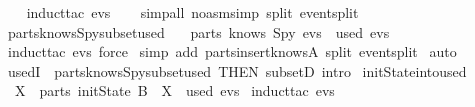 \begin{isabellebody}
  \isadelimproof
  \isanewline
  \ \ %
  \endisadelimproof
  \isatagproof
  \isamarkupfalse%
  \ {\isacharparenleft}induct{\isacharunderscore}tac\ {\isachardoublequoteopen}evs{\isachardoublequoteclose}{\isacharparenright}\isanewline
  \ \ \isamarkupfalse%
  \ {\isacharparenleft}simp{\isacharunderscore}all\ {\isacharparenleft}no{\isacharunderscore}asm{\isacharunderscore}simp{\isacharparenright}\ split{\isacharcolon}\ event{\isachardot}split{\isacharparenright}\isanewline
  \isamarkupfalse%
  \endisatagproof
  {\isafoldproof}%
  \isadelimproof
  \isanewline
  \endisadelimproof
  \isanewline
  \isanewline
  \isanewline
  \isamarkupfalse%
  \ parts{\isacharunderscore}knows{\isacharunderscore}Spy{\isacharunderscore}subset{\isacharunderscore}used\ {\isacharcolon}\isanewline
  \ \ {\isachardoublequoteopen}parts\ {\isacharparenleft}knows\ Spy\ evs{\isacharparenright}\ {\isasymsubseteq}\ used\ evs{\isachardoublequoteclose}\isanewline
  \isadelimproof
  \endisadelimproof
  \isatagproof
  \isamarkupfalse%
  \ {\isacharparenleft}induct{\isacharunderscore}tac\ {\isachardoublequoteopen}evs{\isachardoublequoteclose}{\isacharcomma}\ force{\isacharparenright}\isanewline
  \isamarkupfalse%
  \ {\isacharparenleft}simp\ add{\isacharcolon}\ parts{\isacharunderscore}insert{\isacharunderscore}knows{\isacharunderscore}A\ split{\isacharcolon}\ event{\isachardot}split{\isacharparenright}\isanewline
  \isamarkupfalse%
  \ {\isacharparenleft}auto{\isacharparenright}\isanewline
  \isamarkupfalse%
  \endisatagproof
  {\isafoldproof}%
  \isadelimproof
  \isanewline
  \endisadelimproof
  \isanewline
  \isamarkupfalse%
  \ usedI\ {\isacharequal}\ parts{\isacharunderscore}knows{\isacharunderscore}Spy{\isacharunderscore}subset{\isacharunderscore}used\ {\isacharbrackleft}THEN\ subsetD{\isacharcomma}\ intro{\isacharbrackright}\isanewline
  \isanewline
  \isamarkupfalse%
  \ initState{\isacharunderscore}into{\isacharunderscore}used\ {\isacharcolon}\isanewline
  \ \ {\isachardoublequoteopen}X\ {\isasymin}\ parts\ {\isacharparenleft}initState\ B{\isacharparenright}\ {\isacharequal}{\isacharequal}{\isachargreater}\ X\ {\isasymin}\ used\ evs{\isachardoublequoteclose}\isanewline
  \isadelimproof
  \endisadelimproof
  \isatagproof
  \isamarkupfalse%
  \ {\isacharparenleft}induct{\isacharunderscore}tac\ {\isachardoublequoteopen}evs{\isachardoublequoteclose}{\isacharparenright}\isanewline

\end{isabellebody}

